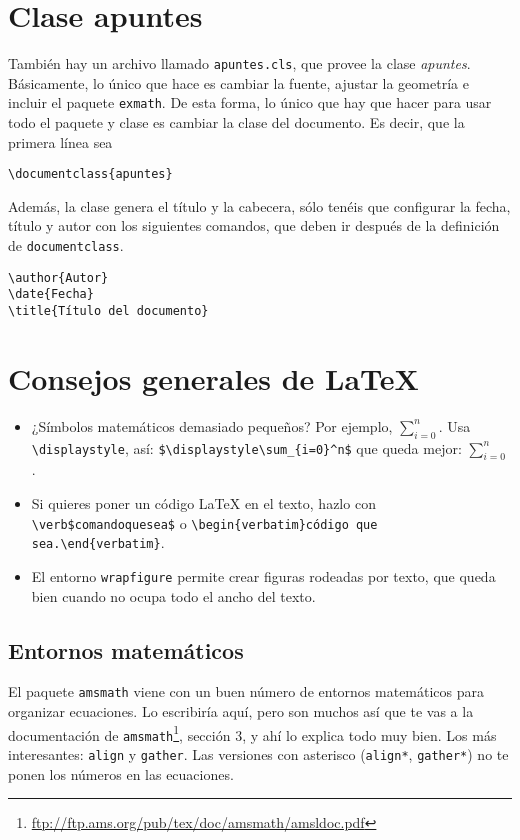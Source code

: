 \documentclass[nochap]{apuntes}
\begin{document}
 \section{Clase apuntes}

 También hay un archivo llamado \texttt{apuntes.cls}, que provee la clase \textit{apuntes}. Básicamente, lo único que hace es cambiar la fuente, ajustar la geometría e incluir el paquete \texttt{exmath}. De esta forma, lo único que hay que hacer para usar todo el paquete y clase es cambiar la clase del documento. Es decir, que la primera línea sea

\begin{verbatim}
\documentclass{apuntes}
\end{verbatim}

 Además, la clase genera el título y la cabecera, sólo tenéis que configurar la fecha, título y autor con los siguientes comandos, que deben ir después de la definición de \texttt{documentclass}.

\begin{verbatim}
\author{Autor}
\date{Fecha}
\title{Título del documento}
\end{verbatim}

\section{Consejos generales de \LaTeX}

\begin{itemize}
\item ¿Símbolos matemáticos demasiado pequeños? Por ejemplo, $\sum_{i=0}^n$. Usa \verb|\displaystyle|, así: \verb|$\displaystyle\sum_{i=0}^n$| que queda mejor: $\displaystyle\sum_{i=0}^n$.
\item Si quieres poner un código LaTeX en el texto, hazlo con \verb|\verb$comandoquesea$| o \verb|\begin{verbatim}código que sea.\end{verbatim}|.
\item El entorno \texttt{wrapfigure} permite crear figuras rodeadas por texto, que queda bien cuando no ocupa  todo el ancho del texto.
\end{itemize}

\subsection{Entornos matemáticos}

El paquete \texttt{amsmath} viene con un buen número de entornos matemáticos para organizar ecuaciones. Lo escribiría aquí, pero son muchos así que te vas a la documentación de \texttt{amsmath}\footnote{\url{ftp://ftp.ams.org/pub/tex/doc/amsmath/amsldoc.pdf}}, sección 3, y ahí lo explica todo muy bien. Los más interesantes: \texttt{align} y \texttt{gather}. Las versiones con asterisco (\texttt{align*}, \texttt{gather*}) no te ponen los números en las ecuaciones.
\end{document}
